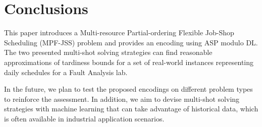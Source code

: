 \documentclass[submission,copyright,creativecommons]{eptcs}
\newcommand{\jss}{MPF-JSS\xspace}
\begin{document}
\section{Conclusions}
This paper introduces a Multi-resource Partial-ordering Flexible Job-Shop Scheduling (\jss) problem and provides an encoding using ASP modulo DL. The two presented multi-shot solving strategies can find reasonable approximations of tardiness bounds for a set of real-world instances representing daily schedules for a Fault Analysis lab. %

In the future, we plan to test the proposed encodings on different problem types to reinforce the assessment. In addition, we aim to devise multi-shot solving strategies with machine learning that can take advantage of historical data, which is often available in industrial application scenarios. 

\nocite{*}


\end{document}
